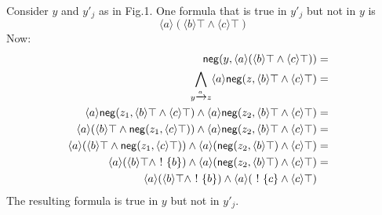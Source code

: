 Consider $y$ and $y'_j$ as in Fig.1.
One formula that is true in $y'_j$ but not in $y$ is
\[
\langle a \rangle (\langle b \rangle \top \land \langle c \rangle \top)
\]
Now:
\begin{eqnarray}
\mathsf{neg}(y, \langle a \rangle (\langle b \rangle \top \land \langle c \rangle \top)) & = & \nonumber \\
\bigwedge\limits_{y \xrightarrow{a} z} \langle a \rangle \mathsf{neg}(z, \langle b \rangle \top \land \langle c \rangle \top) & = & \nonumber \\
\langle a \rangle \mathsf{neg}(z_1, \langle b \rangle \top \land \langle c \rangle \top) \land \langle a \rangle\mathsf{neg}(z_2, \langle b \rangle \top \land \langle c \rangle \top) & = & \nonumber \\
\langle a \rangle (\langle b \rangle \top \land \mathsf{neg}(z_1, \langle c \rangle \top)) \land \langle a \rangle\mathsf{neg}(z_2, \langle b \rangle \top \land \langle c \rangle \top) & = & \nonumber \\
\langle a \rangle (\langle b \rangle \top \land \mathsf{neg}(z_1, \langle c \rangle \top)) \land \langle a \rangle(\mathsf{neg}(z_2, \langle b \rangle \top) \land \langle c \rangle \top) & = & \nonumber \\
\langle a \rangle (\langle b \rangle \top \land \ ! \  \{b\}) \land \langle a \rangle(\mathsf{neg}(z_2, \langle b \rangle \top) \land \langle c \rangle \top) & = & \nonumber \\
\langle a \rangle (\langle b \rangle \top \land \ ! \  \{b\}) \land \langle a \rangle(\ ! \  \{c\} \land \langle c \rangle \top) & & \nonumber
\end{eqnarray}
The resulting formula is true in $y$ but not in $y'_j$.


